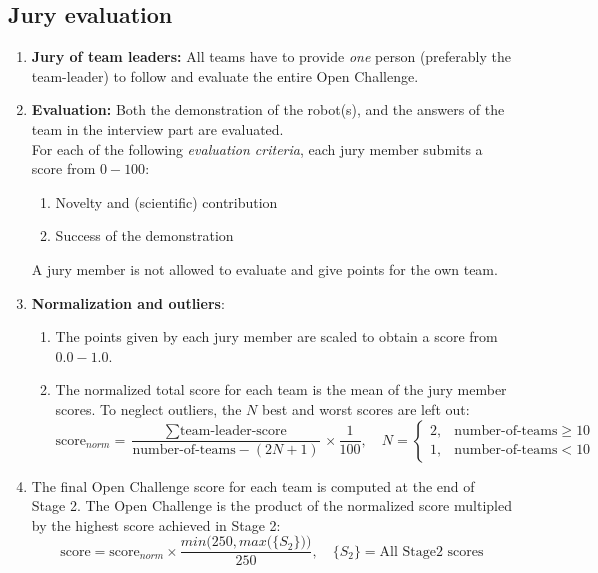 \OpenDemonstrationChanges

\subsection{Jury evaluation}
\begin{enumerate}
  \item \textbf{Jury of team leaders:} All teams have to provide \emph{one} person
  (preferably the team-leader) to follow and evaluate the entire Open Challenge.
  \item \textbf{Evaluation:} Both the demonstration of the robot(s), and the answers of the team in the interview part are evaluated.\\
  For each of the following \emph{evaluation criteria}, each jury member submits a score from $0-100$:
  \begin{enumerate}
  \item Novelty and (scientific) contribution
  \item Success of the demonstration
  \end{enumerate}
  A jury member is not allowed to evaluate and give points for the own team.
  \item \textbf{Normalization and outliers}:
  \begin{enumerate}
    \item The points given by each jury member are scaled to obtain a score from $0.0-1.0$.
    \item The normalized total score for each team is the mean of the jury member scores.
      To neglect outliers, the $N$ best and worst scores are left out:
      $$\mbox{score}_{norm} = \frac{\sum\mbox{team-leader-score}}{\mbox{number-of-teams} - (2N+1)}\times\frac{1}{100},
      \quad N=\begin{cases}2, & \mbox{number-of-teams} \ge 10\\1, & \mbox{number-of-teams} < 10 \end{cases}$$
    \end{enumerate}
    \item The final Open Challenge score for each team is computed at the end of Stage 2. The Open Challenge  is the product of the normalized score multipled by the highest score achieved in Stage 2:
    $$\mbox{score} = \mbox{score}_{norm} \times \frac{min\Big(250, max\big(\{S_2\}\big)\Big)}{250},
    \quad \{S_2\}=\mbox{All Stage2 scores}
    $$
\end{enumerate}

